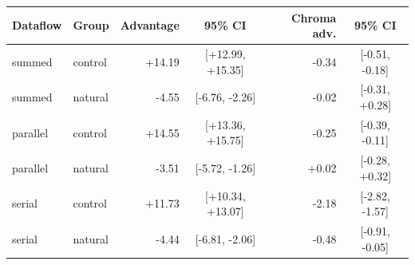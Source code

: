 \begin{tabular}{llrcrc}
\hline
Dataflow & Group & Advantage & 95\% CI & Chroma adv. & 95\% CI \\
\hline
summed & control & +14.19 & [+12.99, +15.35] & -0.34 & [-0.51, -0.18] \\
summed & natural & -4.55 & [-6.76, -2.26] & -0.02 & [-0.31, +0.28] \\
parallel & control & +14.55 & [+13.36, +15.75] & -0.25 & [-0.39, -0.11] \\
parallel & natural & -3.51 & [-5.72, -1.26] & +0.02 & [-0.28, +0.32] \\
serial & control & +11.73 & [+10.34, +13.07] & -2.18 & [-2.82, -1.57] \\
serial & natural & -4.44 & [-6.81, -2.06] & -0.48 & [-0.91, -0.05] \\
\hline
\end{tabular}
